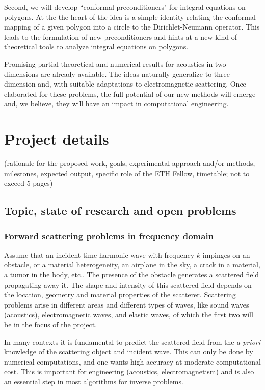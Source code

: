 \documentclass[]{report}
\newcommand{\drop}[1]{{\color{blue}#1}}
\begin{document}
{{    Second, we will develop ``conformal preconditioners" for integral equations on
    polygons. At the the heart of the idea is a simple identity relating the conformal
    mapping of a given polygon into a circle to the Dirichlet-Neumann operator. This leads
    to the formulation of new preconditioners and hints at a new kind of theoretical tools
    to analyze integral equations on polygons.

    Promising partial theoretical and numerical results for acoustics in two dimensions
    are already available. The ideas naturally generalize to three dimension and, with
    suitable adaptations to electromagnetic scattering. Once elaborated for these
    problems, the full potential of our new methods will emerge and, we believe, they will
    have an impact in computational engineering. 
    }}

\section{Project details}
\drop{(rationale for the proposed work, goals, experimental approach and/or methods, milestones, expected output, specific role of the ETH Fellow, timetable; not to exceed 5 pages)}

\subsection{Topic, state of research and open problems}

\subsubsection*{Forward scattering problems in frequency domain}	

Assume that an incident time-harmonic wave with frequency $k$ impinges on an obstacle, or
a material heterogeneity, an airplane in the sky, a crack in a material, a tumor in the
body, etc.. The presence of the obstacle generates a scattered field propagating away
it. The shape and intensity of this scattered field depends on the location, geometry and
material properties of the scatterer. Scattering problems arise in different areas and
different types of waves, like sound waves (acoustics), electromagnetic waves, and elastic
waves, of which the first two will be in the focus of the project. 

In many contexts it is fundamental to predict the scattered field from the \textit{a
  priori} knowledge of the scattering object and incident wave. This can only be done by
numerical computations, and one wants high accuracy at moderate computational cost. This
is important for engineering (acoustics, electromagnetism) and is also an essential step
in most algorithms for inverse problems.
\end{document}
